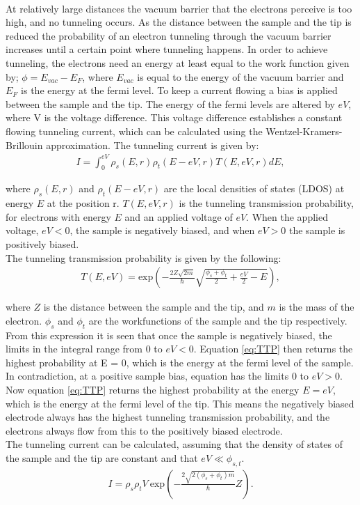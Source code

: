 \\
At relatively large distances the vacuum barrier that the electrons perceive is too high, and no tunneling occurs. As the distance between the sample and the tip is reduced the probability of an electron tunneling through the vacuum barrier increases until a certain point where tunneling happens. In order to achieve tunneling, the electrons need an energy at least equal to the work function given by; $\phi = E_{vac} - E_F$, where $E_{vac}$ is equal to the energy of the vacuum barrier and $E_F$ is the energy at the fermi level. To keep a current flowing a bias is applied between the sample and the tip. The energy of the fermi levels are altered by $eV$, where V is the voltage difference. This voltage difference establishes a constant flowing tunneling current, which can be calculated using the Wentzel-Kramers-Brillouin approximation. The tunneling current is given by:\cite{STMbog}
\begin{align}
  I = \int_0^{eV} \rho_s(E,r) \rho_t(E-eV,r)T(E,eV,r)dE,
  \label{eq:Iint}
\end{align}

where $\rho_s(E,r)$ and $\rho_t(E-eV,r)$ are the local densities of states (LDOS) at energy $E$ at the position r. $T(E,eV,r)$ is the tunneling transmission probability, for electrons with energy $E$ and an applied voltage of $eV$. When the applied voltage, $eV < 0$, the sample is negatively biased, and when $eV > 0$ the sample is positively biased.\\
The tunneling transmission probability is given by the following:\cite{STMbog}
\begin{align}
  T(E,eV) = \text{exp}\left( -\frac{2Z\sqrt{2m}}{\hbar} \sqrt{\frac{\phi_s + \phi_t}{2}+\frac{eV}{2}-E} \right),
  \label{eq:TTP}
\end{align}

where $Z$ is the distance between the sample and the tip, and $m$ is the mass of the electron. $\phi_s$ and $\phi_t$ are the workfunctions of the sample and the tip respectively. From this expression it is seen that once the sample is negatively biased, the limits in the integral range from 0 to $eV<0$. Equation \ref{eq:TTP} then returns the highest probability at E = 0, which is the energy at the fermi level of the sample. In contradiction, at a positive sample bias, equation \label{eq:Iint} has the limits 0 to $eV>0$. Now equation \ref{eq:TTP} returns the highest probability at the energy $E = eV$, which is the energy at the fermi level of the tip. This means the negatively biased electrode always has the highest tunneling transmission probability, and the electrons always flow from this to the positively biased electrode.\\
The tunneling current can be calculated, assuming that the density of states of the sample and the tip are constant and that $eV \ll \phi_{s,t}$.\cite{STMbog,PhysRevLett.49.57}
\begin{align}
  I = \rho_s \rho_t V \: \text{exp}\left(-\frac{2\sqrt{2(\phi_s+\phi_t)m}}{\hbar}Z \right).
  \label{eq:TC}
\end{align}

